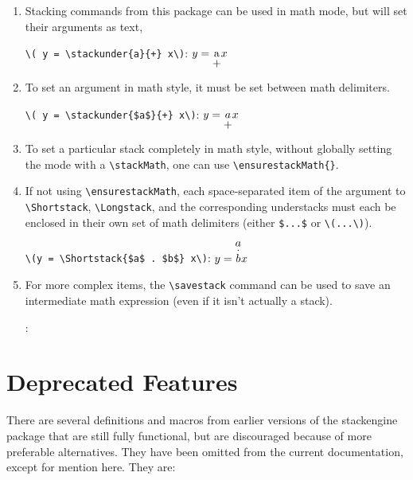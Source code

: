 \documentclass{article}
\def\ste{\textsf{stackengine}}
\let\vb\verb
\begin{document}
\begin{enumerate}

\item Stacking commands from this package can be used in math mode, but
will set their arguments as text, 

\vb|\( y = \stackunder{a}{+} x\)|:\hfill
\( y = \stackunder{a}{+} x\)

\item To set an argument in math style, it must be set between math
delimiters.

\vb|\( y = \stackunder{$a$}{+} x\)|:\hfill
\( y = \stackunder{$a$}{+} x\)

\item To set a particular stack completely in math style, without globally setting the mode with a \verb|\stackMath|, one can use \verb|\ensurestackMath{}|.

\item If not using \verb|\ensurestackMath|, each space-separated item of the argument to \vb|\Shortstack|,
\vb|\Longstack|, and the corresponding understacks must each be enclosed
in their own set of math delimiters (either \verb|$...$| or \verb|\(...\)|).

\vb|\(y = \Shortstack{$a$ . $b$} x\)|:\hfill
\(y = \Shortstack{$a$ . $b$} x\)

\item For more complex items, the \vb|\savestack| command can be used
to save an intermediate math expression (even if it isn't actually a
stack).

\theverbbox:\hfill
{}
\savestack{\dash}{- - - - -}

\end{enumerate}

\section{Deprecated Features\label{s:df}}

There are several definitions and macros from earlier versions of the 
{\ste} package that are still fully functional, but are discouraged 
because of more preferable alternatives.  They have been omitted from the
current documentation, except for mention here.  They are:
\end{document}
